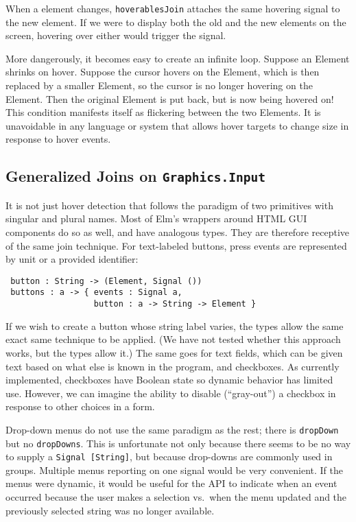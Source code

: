 \documentclass{article}
\begin{document}
When a element changes, \texttt{hoverablesJoin} attaches the same
hovering signal to the new element. If we were to display both the old
and the new elements on the screen, hovering over either would trigger
the signal.

More dangerously, it becomes easy to create an infinite loop. Suppose an
Element shrinks on hover. Suppose the cursor hovers on the Element,
which is then replaced by a smaller Element, so the cursor is no longer
hovering on the Element. Then the original Element is put back, but is
now being hovered on! This condition manifests itself as flickering
between the two Elements. It is unavoidable in any language or system
that allows hover targets to change size in response to hover events.

\subsection{Generalized Joins on \texttt{Graphics.Input}}

It is not just hover detection that follows the paradigm of two primitives
with singular and plural names. Most of Elm's wrappers around HTML GUI
components do so as well, and have analogous types. They are therefore receptive
of the same join technique. For text-labeled buttons, press events are
represented by unit or a provided identifier:

\begin{verbatim}
 button : String -> (Element, Signal ())
 buttons : a -> { events : Signal a,
                  button : a -> String -> Element }
\end{verbatim}

If we wish to create a button whose string label varies, the types allow
the same exact same technique to be applied. (We have not tested whether
this approach works, but the types allow it.) The same goes for text
fields, which can be given text based on what else is known in the
program, and checkboxes. As currently implemented, checkboxes have
Boolean state so dynamic behavior has limited use. However, we can
imagine the ability to disable (``gray-out'') a checkbox in response to
other choices in a form.

Drop-down menus do not use the same paradigm as the rest; there is
\texttt{dropDown} but no \texttt{dropDowns}. This is unfortunate not
only because there seems to be no way to supply a
\texttt{Signal {[}String{]}}, but because drop-downs are commonly used
in groups. Multiple menus reporting on one signal would be very
convenient. If the menus were dynamic, it would be useful for the API to
indicate when an event occurred because the user makes a selection vs.~when the
menu updated and the previously selected string was no longer available.
\end{document}
